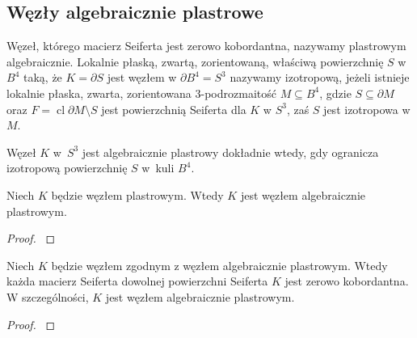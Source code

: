
\subsection{Węzły algebraicznie plastrowe}
Węzeł, którego macierz Seiferta jest zerowo kobordantna, nazywamy plastrowym algebraicznie.
Lokalnie płaską, zwartą, zorientowaną, właściwą powierzchnię $S$ w $B^4$ taką, że $K = \partial S$ jest węzłem w $\partial B^4 = S^3$ nazywamy izotropową, jeżeli istnieje lokalnie płaska, zwarta, zorientowana 3-podrozmaitość $M \subseteq B^4$, gdzie $S \subseteq \partial M$ oraz $F = \operatorname{cl} \partial M \setminus S$ jest powierzchnią Seiferta dla $K$ w $S^3$, zaś $S$ jest izotropowa w $M$.

\begin{proposition}
    Węzeł $K$ w~$S^3$ jest algebraicznie plastrowy dokładnie wtedy, gdy ogranicza izotropową powierzchnię $S$ w~kuli $B^4$.
\end{proposition}

\begin{corollary}
    Niech $K$ będzie węzłem plastrowym.
    Wtedy $K$ jest węzłem algebraicznie plastrowym.
\end{corollary}

\begin{proof}
    \cite[s. 158]{kawauchi96}
\end{proof}

\begin{proposition}
    \label{prp:cobordant_to_algebraic_is_algebraic}
    Niech $K$ będzie węzłem zgodnym z węzłem algebraicznie plastrowym.
    Wtedy każda macierz Seiferta dowolnej powierzchni Seiferta $K$ jest zerowo kobordantna.
    W szczególności, $K$ jest węzłem algebraicznie plastrowym.
\end{proposition}

\begin{proof}
    \cite[s. 159]{kawauchi96}
\end{proof}



